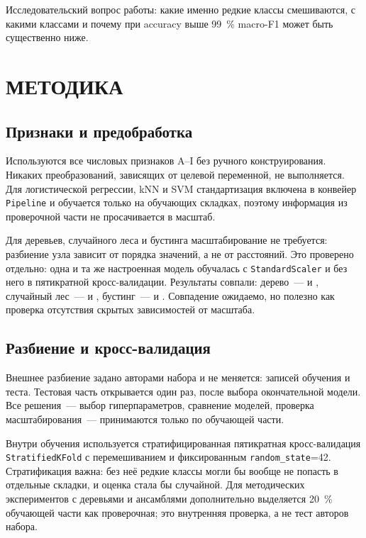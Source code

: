 \documentclass[14pt,a4paper]{extarticle}
\begin{document}
Исследовательский вопрос работы: какие именно редкие классы смешиваются,
с какими классами и почему при accuracy выше 99~\% macro-F1 может быть
существенно ниже.

\section{МЕТОДИКА}

\subsection{Признаки и предобработка}
\label{sec:scaling}

Используются все \NFeatures{} числовых признаков A--I без ручного
конструирования. Никаких преобразований, зависящих от целевой переменной,
не выполняется. Для логистической регрессии, kNN и SVM стандартизация
включена в конвейер \texttt{Pipeline} и обучается только на обучающих
складках, поэтому информация из проверочной части не просачивается
в масштаб.

Для деревьев, случайного леса и бустинга масштабирование не требуется:
разбиение узла зависит от порядка значений, а не от расстояний. Это
проверено отдельно: одна и та же настроенная модель обучалась с
\texttt{StandardScaler} и без него в пятикратной кросс-валидации.
Результаты совпали: дерево~--- \ScaleTreeRaw{} и \ScaleTreeScaled,
случайный лес~--- \ScaleRfRaw{} и \ScaleRfScaled, бустинг~---
\ScaleHgbRaw{} и \ScaleHgbScaled. Совпадение ожидаемо, но полезно как
проверка отсутствия скрытых зависимостей от масштаба.

\subsection{Разбиение и кросс-валидация}

Внешнее разбиение задано авторами набора и не меняется: \NTrain{} записей
обучения и \NTest{} теста. Тестовая часть открывается один раз, после
выбора окончательной модели. Все решения~--- выбор гиперпараметров,
сравнение моделей, проверка масштабирования~--- принимаются только
по обучающей части.

Внутри обучения используется стратифицированная пятикратная
кросс-валидация \texttt{StratifiedKFold} с перемешиванием и фиксированным
\texttt{random\_state}=42. Стратификация важна: без неё редкие классы
могли бы вообще не попасть в отдельные складки, и оценка стала бы
случайной. Для методических экспериментов с деревьями и ансамблями
дополнительно выделяется 20~\% обучающей части как проверочная; это
внутренняя проверка, а не тест авторов набора.
\end{document}
